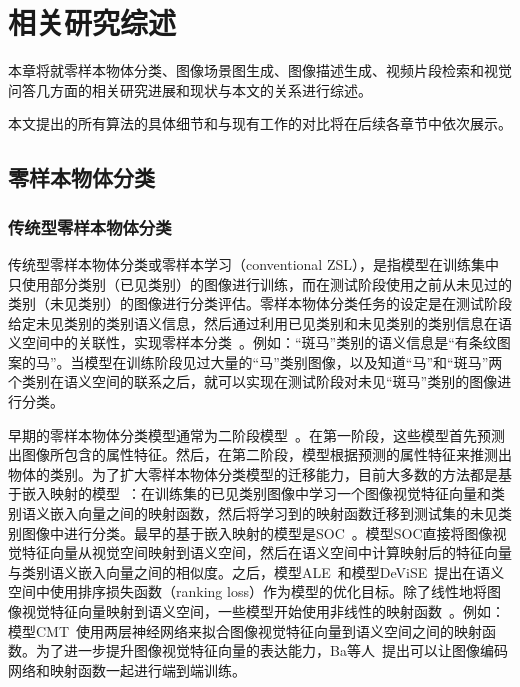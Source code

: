 \chapter{相关研究综述}

本章将就零样本物体分类、图像场景图生成、图像描述生成、视频片段检索和视觉问答几方面的相关研究进展和现状与本文的关系进行综述。

本文提出的所有算法的具体细节和与现有工作的对比将在后续各章节中依次展示。


\section{零样本物体分类}

\subsection{传统型零样本物体分类}
传统型零样本物体分类或零样本学习（conventional ZSL），是指模型在训练集中只使用部分类别（已见类别）的图像进行训练，而在测试阶段使用之前从未见过的类别（未见类别）的图像进行分类评估。零样本物体分类任务的设定是在测试阶段给定未见类别的类别语义信息，然后通过利用已见类别和未见类别的类别信息在语义空间中的关联性，实现零样本分类~\cite{farhadi2009describing,lampert2009learning,romera2015embarrassingly,norouzi2014zero,demirel2017attributes2classname,jiang2017learning}。例如：“斑马”类别的语义信息是“有条纹图案的马”。当模型在训练阶段见过大量的“马”类别图像，以及知道“马”和“斑马”两个类别在语义空间的联系之后，就可以实现在测试阶段对未见“斑马”类别的图像进行分类。

早期的零样本物体分类模型通常为二阶段模型~\cite{lampert2013attribute,norouzi2014zero,al2016recovering,jayaraman2014zero,kankuekul2012online}。在第一阶段，这些模型首先预测出图像所包含的属性特征。然后，在第二阶段，模型根据预测的属性特征来推测出物体的类别。为了扩大零样本物体分类模型的迁移能力，目前大多数的方法都是基于嵌入映射的模型~\cite{palatucci2009zero,frome2013devise,akata2015label,akata2015evaluation,romera2015embarrassingly,xian2016latent,socher2013zero,kodirov2017semantic,li2017zero}：在训练集的已见类别图像中学习一个图像视觉特征向量和类别语义嵌入向量之间的映射函数，然后将学习到的映射函数迁移到测试集的未见类别图像中进行分类。最早的基于嵌入映射的模型是SOC~\cite{palatucci2009zero}。模型SOC直接将图像视觉特征向量从视觉空间映射到语义空间，然后在语义空间中计算映射后的特征向量与类别语义嵌入向量之间的相似度。之后，模型ALE~\cite{akata2015label}和模型DeViSE~\cite{frome2013devise}提出在语义空间中使用排序损失函数（ranking loss）作为模型的优化目标。除了线性地将图像视觉特征向量映射到语义空间，一些模型开始使用非线性的映射函数~\cite{xian2016latent}。例如：模型CMT~\cite{socher2013zero}使用两层神经网络来拟合图像视觉特征向量到语义空间之间的映射函数。为了进一步提升图像视觉特征向量的表达能力，Ba等人~\cite{lei2015predicting}提出可以让图像编码网络和映射函数一起进行端到端训练。

